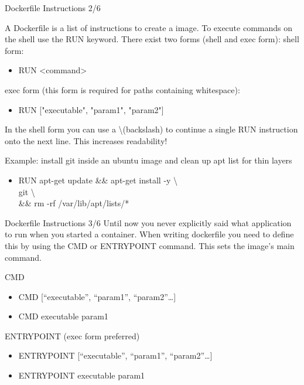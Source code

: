 \documentclass[10pt,aspectratio=\ratio,
compress
]{beamer}
\begin{document}
\begin{frame}{Dockerfile Instructions 2/6}

A Dockerfile is a list of instructions to create a image.
To execute commands on the shell use the RUN keyword.
There exist two forms (shell and exec form):
shell form:
\begin{itemize}
	\item RUN <command>
\end{itemize}
exec form (this form is required for paths containing whitespace):
\begin{itemize}
	\item RUN ["executable", "param1", "param2"]
\end{itemize}

In the shell form you can use a \textbackslash  (backslash) to continue a single RUN instruction onto the next line. This increases readability!


Example: install git inside an ubuntu image and clean up apt list for thin layers
\begin{itemize}
	\item RUN apt-get update \&\& apt-get install -y \textbackslash \\
	git \textbackslash \\
	\&\& rm -rf /var/lib/apt/lists/*
\end{itemize}
\end{frame}


\begin{frame}{Dockerfile Instructions 3/6}
Until now you never explicitly said what application to run when you started a container.
When writing dockerfile you need to define this by using the CMD or ENTRYPOINT command. This sets the image’s main command.

CMD
\begin{itemize}
	\item CMD [“executable”, “param1”, “param2”…]
	\item CMD executable param1
\end{itemize}


ENTRYPOINT (exec form preferred)
\begin{itemize}
	\item ENTRYPOINT [“executable”, “param1”, “param2”…]
	\item ENTRYPOINT executable param1
\end{itemize}
\end{frame}
\end{document}
